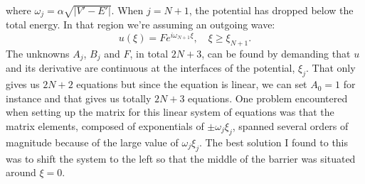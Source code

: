 \documentclass[twocolumn]{article}
\begin{document}
\begin{large}
\begin{equation*}
\end{equation*}
where $\omega_j = \alpha\sqrt{|V'-E'|}$. When $j=N+1$, the potential has dropped below the total energy. In that region we're assuming an outgoing wave:
\begin{equation*}
    u(\xi) = Fe^{i\omega_{N+1}\xi},\quad \xi\geq \xi_{N+1}.
\end{equation*}
The unknowns $A_j$, $B_j$ and $F$, in total $2N+3$, can be found by demanding that $u$ and its derivative are continuous at the interfaces of the potential, $\xi_j$. That only gives us $2N+2$ equations but since the equation is linear, we can set $A_0 = 1$ for instance and that gives us totally $2N+3$ equations. One problem encountered when setting up the matrix for this linear system of equations was that the matrix elements, composed of exponentials of $\pm\omega_j\xi_j$, spanned several orders of magnitude because of the large value of $\omega_j\xi_j$. The best solution I found to this was to shift the system to the left so that the middle of the barrier was situated around $\xi=0$.  


\end{large}
\end{document}
